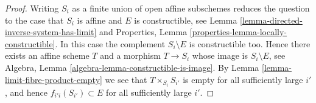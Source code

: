 \documentclass[10pt,a4paper]{amsart}
\theoremstyle{plain}
\theoremstyle{definition}
\theoremstyle{remark}
\numberwithin{equation}{subsection}
\begin{document}
\begin{proof}
Writing $S_i$ as a finite union of open affine subschemes reduces
the question to the case that $S_i$ is affine and $E$ is constructible, see
Lemma \ref{lemma-directed-inverse-system-has-limit}
and
Properties, Lemma \ref{properties-lemma-locally-constructible}.
In this case the complement $S_i \setminus E$ is constructible too.
Hence there exists an affine scheme $T$ and a morphism $T \to S_i$
whose image is $S_i \setminus E$, see
Algebra, Lemma \ref{algebra-lemma-constructible-is-image}.
By
Lemma \ref{lemma-limit-fibre-product-empty}
we see that $T \times_{S_i} S_{i'}$ is empty for all sufficiently large
$i'$, and hence $f_{i'i}(S_{i'}) \subset E$ for all sufficiently large $i'$.
\end{proof}
\end{document}
